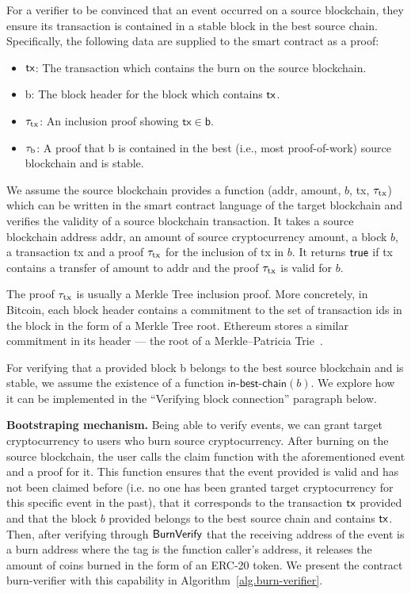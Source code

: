 For a verifier to be convinced that an event occurred on a source blockchain, they ensure its transaction is contained in a stable block in the best source chain. Specifically, the following data are supplied to the smart contract as a proof:

\begin{itemize}
  \item $\textsf{tx}$: The transaction which contains the burn on the source blockchain.
  \item \textsf{b}: The block header for the block which contains $\textsf{tx}$.
  \item $\tau_\text{tx}$: An inclusion proof showing $\mathsf{tx} \in \mathsf{b}$.
  \item $\tau_\text{b}$: A proof that \textsf{b} is contained in the best (i.e., most proof-of-work) source blockchain and is stable.
\end{itemize}

We assume the source blockchain provides a function \verifytx(\textsf{addr}, \textsf{amount}, $b$, \textsf{tx}, $\tau_\text{tx}$) which can be written in the smart contract language of the target blockchain and verifies the validity of a source blockchain transaction. It takes a source blockchain address \textsf{addr}, an amount of source cryptocurrency \textsf{amount}, a block $b$, a transaction \textsf{tx} and a proof $\tau_\text{tx}$ for the inclusion of \textsf{tx} in $b$. It returns $\mathsf{true}$ if \textsf{tx} contains a transfer of \textsf{amount} to \textsf{addr} and the proof $\tau_\text{tx}$ is valid for $b$.

The proof $\tau_\text{tx}$ is usually a Merkle Tree inclusion proof. More concretely, in Bitcoin, each block header contains a commitment to the set of transaction ids in the block in the form of a Merkle Tree root. Ethereum stores a similar commitment in its header --- the root of a Merkle--Patricia Trie~\cite{wood2014ethereum}.

For verifying that a provided block \textsf{b} belongs to the best source blockchain and is stable, we assume the existence of a function $\textsf{in-best-chain}(b)$. We explore how it can be implemented in the ``Verifying block connection'' paragraph below.

\noindent
\textbf{Bootstraping mechanism.}
Being able to verify events, we can grant target cryptocurrency to users who burn source cryptocurrency. After burning on the source blockchain, the user calls the \textsf{claim} function with the aforementioned event and a proof for it. This function ensures that the event provided is valid and has not been claimed before (i.e. no one has been granted target cryptocurrency for this specific event in the past), that it corresponds to the transaction $\textsf{tx}$ provided and that the block $b$ provided belongs to the best source chain and contains $\textsf{tx}$. Then, after verifying through $\mathsf{BurnVerify}$ that the receiving address of the event is a burn address where the tag is the function caller's address, it releases the amount of coins burned in the form of an ERC-20 token. We present the contract \textsf{burn-verifier} with this capability in Algorithm~\ref{alg.burn-verifier}.

